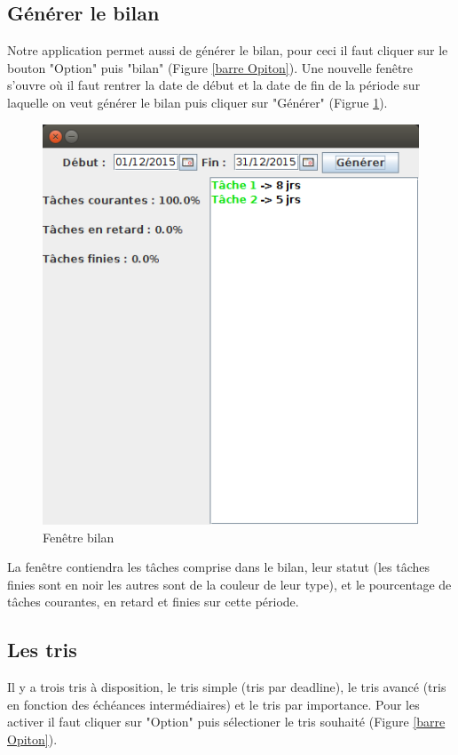 \documentclass{article}
\begin{document}
\subsection{Générer le bilan}

Notre application permet aussi de générer le bilan, pour ceci il faut cliquer sur le bouton "Option" puis "bilan" (Figure \ref{barre Opiton}).
Une nouvelle fenêtre s'ouvre où il faut rentrer la date de début et la date de fin de la période sur laquelle on veut générer le bilan puis cliquer sur "Générer" (Figrue \ref{bilan}).

\begin{figure}
	\centering
	\includegraphics[scale=0.4]{images/CaptureDisplayBilan.png}
	\caption{Fenêtre bilan}
	\label{bilan}
\end{figure}

La fenêtre contiendra les tâches comprise dans le bilan, leur statut (les tâches finies sont en noir les autres sont de la couleur de leur type), et le pourcentage de tâches courantes, en retard et finies sur cette période.

\subsection{Les tris}

Il y a trois tris à disposition, le tris simple (tris par deadline), le tris avancé (tris en fonction des échéances intermédiaires) et le tris par importance. Pour les activer il faut cliquer sur "Option" puis sélectioner le tris souhaité (Figure \ref{barre Opiton}).
\end{document}

